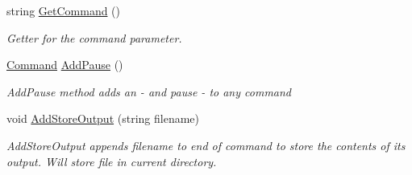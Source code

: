 \begin{DoxyCompactItemize}
string \mbox{\hyperlink{class_cli_tool_space_1_1_command_a6580ca3f6b4ad7f4be3dfc968e317c20}{Get\+Command}} ()
\begin{DoxyCompactList}\small\item\em Getter for the command parameter. \end{DoxyCompactList}\item 
\mbox{\hyperlink{class_cli_tool_space_1_1_command}{Command}} \mbox{\hyperlink{class_cli_tool_space_1_1_command_a9e3b37320d8980e4c1e83eb109f486e5}{Add\+Pause}} ()
\begin{DoxyCompactList}\small\item\em Add\+Pause method adds an -\/ and pause -\/ to any command \end{DoxyCompactList}\item 
void \mbox{\hyperlink{class_cli_tool_space_1_1_command_aa49e056d4052177768a13fac33991942}{Add\+Store\+Output}} (string filename)
\begin{DoxyCompactList}\small\item\em Add\+Store\+Output appends filename to end of command to store the contents of it\textquotesingle{}s output. Will store file in current directory. \end{DoxyCompactList}\end{DoxyCompactItemize}
